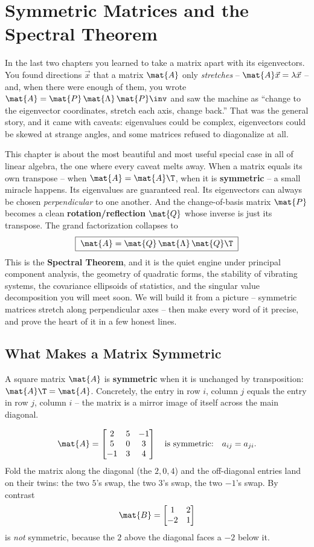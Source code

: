 \chapter{Symmetric Matrices and the Spectral Theorem}

In the last two chapters you learned to take a matrix apart with its
eigenvectors. You found directions $\vec{x}$ that a matrix $\mat{A}$ only
\emph{stretches} -- $\mat{A}\vec{x} = \lambda\vec{x}$ -- and, when there were
enough of them, you wrote $\mat{A} = \mat{P}\,\mat{\Lambda}\,\mat{P}\inv$ and
saw the machine as ``change to the eigenvector coordinates, stretch each axis,
change back.'' That was the general story, and it came with caveats: eigenvalues
could be complex, eigenvectors could be skewed at strange angles, and some
matrices refused to diagonalize at all.

This chapter is about the most beautiful and most useful special case in all of
linear algebra, the one where every caveat melts away. When a matrix equals its
own transpose -- when $\mat{A} = \mat{A}\T$, when it is \textbf{symmetric} -- a
small miracle happens. Its eigenvalues are guaranteed real. Its eigenvectors can
always be chosen \emph{perpendicular} to one another. And the change-of-basis
matrix $\mat{P}$ becomes a clean \textbf{rotation/reflection} $\mat{Q}$ whose
inverse is just its transpose. The grand factorization collapses to
\[
  \boxed{\;\mat{A} = \mat{Q}\,\mat{\Lambda}\,\mat{Q}\T\;}
\]
This is the \textbf{Spectral Theorem}, and it is the quiet engine under
principal component analysis, the geometry of quadratic forms, the stability of
vibrating systems, the covariance ellipsoids of statistics, and the singular
value decomposition you will meet soon. We will build it from a picture --
symmetric matrices stretch along perpendicular axes -- then make every word of it
precise, and prove the heart of it in a few honest lines.

\section{What Makes a Matrix Symmetric}
\label{ch26:what-is-symmetric}

A square matrix $\mat{A}$ is \textbf{symmetric} when it is unchanged by
transposition: $\mat{A}\T = \mat{A}$. Concretely, the entry in row $i$, column
$j$ equals the entry in row $j$, column $i$ -- the matrix is a mirror image of
itself across the main diagonal.

\[
  \mat{A} = \begin{bmatrix} 2 & 5 & -1 \\ 5 & 0 & 3 \\ -1 & 3 & 4 \end{bmatrix}
  \quad\text{is symmetric:}\quad a_{ij}=a_{ji}.
\]
Fold the matrix along the diagonal (the $2,0,4$) and the off-diagonal entries land
on their twins: the two $5$'s swap, the two $3$'s swap, the two $-1$'s swap. By
contrast
\[
  \mat{B} = \begin{bmatrix} 1 & 2 \\ -2 & 1 \end{bmatrix}
\]
is \emph{not} symmetric, because the $2$ above the diagonal faces a $-2$ below it.

